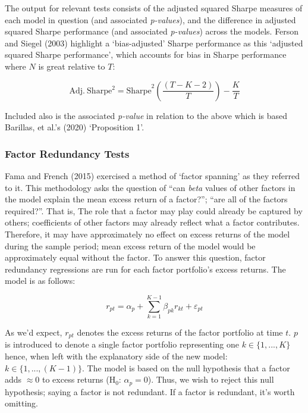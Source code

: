 \documentclass[11pt, english]{article}
\begin{document}
        The output for relevant tests consists of the adjusted squared Sharpe measures of each model in question (and associated \textit{p-values}), and the difference in adjusted squared Sharpe performance (and associated \textit{p-values}) across the models. Ferson and Siegel (2003) highlight a `bias-adjusted' Sharpe performance as this `adjusted squared Sharpe performance', which accounts for bias in Sharpe performance where $N$ is great relative to $T$:

	$$\mathrm{Adj.\ Sharpe^2=Sharpe}^2\left(\frac{(T-K-2)}{T}\right)-\frac{K}{T}$$

        Included also is the associated \textit{p-value} in relation to the above which is based Barillas, et al.'s (2020) `Proposition 1'.

                \subsubsection*{Factor Redundancy Tests}

        Fama and French (2015) exercised a method of `factor spanning' as they referred to it. This methodology asks the question of ``can \textit{beta} values of other factors in the model explain the mean excess return of a factor?''; ``are all of the factors required?''. That is, The role that a factor may play could already be captured by others; coefficients of other factors may already reflect what a factor contributes. Therefore, it may have approximately no effect on excess returns of the model during the sample period; mean excess return of the model would be approximately equal without the factor. To answer this question, factor redundancy regressions are run for each factor portfolio's excess returns. The model is as follows:

        $$r_{pt}=\alpha_p+\sum_{k=1}^{K-1}\beta_{pk}r_{kt}+\varepsilon_{pt}$$

        As we'd expect, $r_{pt}$ denotes the excess returns of the factor portfolio at time $t$. $p$ is introduced to denote a single factor portfolio representing one $k\in\{1,...,K\}$ hence, when left with the explanatory side of the new model: $k\in\{1,...,(K-1)\}$. The model is based on the null hypothesis that a factor adds $\approx0$ to excess returns (H$_0$: $\alpha_p=0$). Thus, we wish to reject this null hypothesis; saying a factor is not redundant. If a factor is redundant, it's worth omitting.\\
\end{document}
